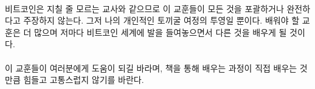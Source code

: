 \paragraph{}
비트코인은 지칠 줄 모르는 교사와 같으므로 이 교훈들이 모든 것을 포괄하거나 완전하다고 주장하지 않는다.
그저 나의 개인적인 토끼굴 여정의 투영일 뿐이다. 배워야 할 교훈은 더 많으며 저마다 비트코인 세계에 발을 들여놓으면서 다른 것을 배우게 될 것이다. 

\paragraph{}
이 교훈들이 여러분에게 도움이 되길 바라며, 책을 통해 배우는 과정이 직접 배우는 것만큼 힘들고 고통스럽지 않기를 바란다. 

%
%
